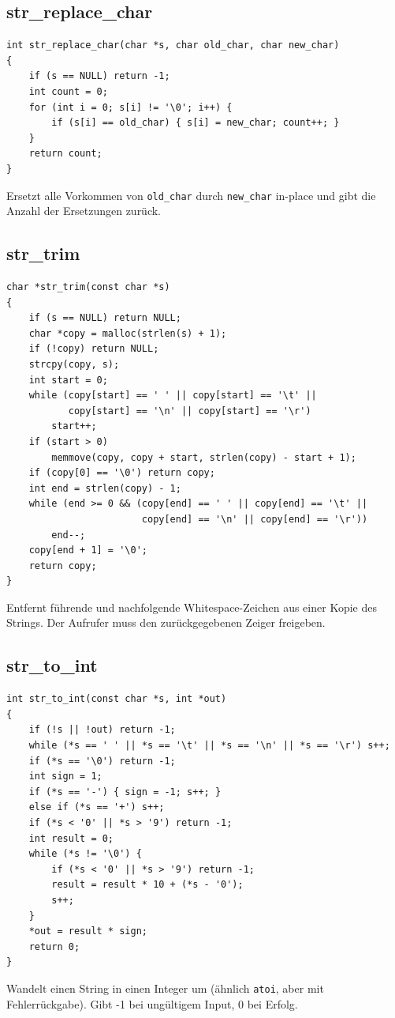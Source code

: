 \documentclass[10pt, a4paper]{article}
\begin{document}
\subsection{str\_replace\_char}
\begin{lstlisting}
int str_replace_char(char *s, char old_char, char new_char)
{
    if (s == NULL) return -1;
    int count = 0;
    for (int i = 0; s[i] != '\0'; i++) {
        if (s[i] == old_char) { s[i] = new_char; count++; }
    }
    return count;
}
\end{lstlisting}
Ersetzt alle Vorkommen von \texttt{old\_char} durch \texttt{new\_char} in-place und gibt die Anzahl der Ersetzungen zur\"uck.

\subsection{str\_trim}
\begin{lstlisting}
char *str_trim(const char *s)
{
    if (s == NULL) return NULL;
    char *copy = malloc(strlen(s) + 1);
    if (!copy) return NULL;
    strcpy(copy, s);
    int start = 0;
    while (copy[start] == ' ' || copy[start] == '\t' ||
           copy[start] == '\n' || copy[start] == '\r')
        start++;
    if (start > 0)
        memmove(copy, copy + start, strlen(copy) - start + 1);
    if (copy[0] == '\0') return copy;
    int end = strlen(copy) - 1;
    while (end >= 0 && (copy[end] == ' ' || copy[end] == '\t' ||
                        copy[end] == '\n' || copy[end] == '\r'))
        end--;
    copy[end + 1] = '\0';
    return copy;
}
\end{lstlisting}
Entfernt f\"uhrende und nachfolgende Whitespace-Zeichen aus einer Kopie des Strings. Der Aufrufer muss den zur\"uckgegebenen Zeiger freigeben.

\subsection{str\_to\_int}
\begin{lstlisting}
int str_to_int(const char *s, int *out)
{
    if (!s || !out) return -1;
    while (*s == ' ' || *s == '\t' || *s == '\n' || *s == '\r') s++;
    if (*s == '\0') return -1;
    int sign = 1;
    if (*s == '-') { sign = -1; s++; }
    else if (*s == '+') s++;
    if (*s < '0' || *s > '9') return -1;
    int result = 0;
    while (*s != '\0') {
        if (*s < '0' || *s > '9') return -1;
        result = result * 10 + (*s - '0');
        s++;
    }
    *out = result * sign;
    return 0;
}
\end{lstlisting}
Wandelt einen String in einen Integer um (\"ahnlich \texttt{atoi}, aber mit Fehlerr\"uckgabe). Gibt -1 bei ung\"ultigem Input, 0 bei Erfolg.
\end{document}
